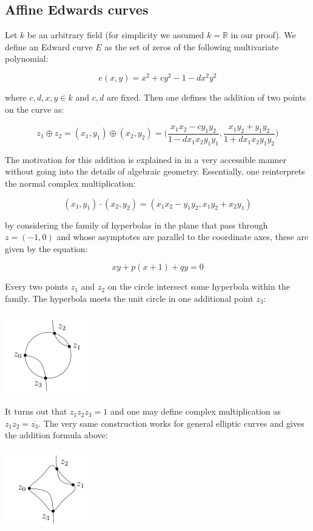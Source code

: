\subsection{Affine Edwards curves}

Let $k$ be an arbitrary field (for simplicity we assumed $k = \mathbb{R}$ in our proof). We define an Edward curve $E$ as the set of zeros of the following multivariate polynomial:

$$e(x,y) = x^2 + cy^2 - 1 - d x^2y^2$$

where $c,d,x,y \in k$ and $c,d$ are fixed. Then one defines the addition of two points on the curve as:

$$z_1 \oplus z_2 = (x_1,y_1) \oplus (x_2,y_2) = \Big(\frac{x_1x_2-cy_1y_2}{1-dx_1x_2y_1y_1},\frac{x_1y_2+y_1 y_2}{1+d x_1 x_2 y_1y_2}\Big)$$

The motivation for this addition is explained in \cite{hales2016group} in a very accessible manner without going into the details of algebraic geometry. Essentially, one reinterprets the normal complex multiplication:

$$(x_1,y_1) \cdot (x_2,y_2) = (x_1 x_2 - y_1 y_2, x_1 y_2 + x_2 y_1)$$

by considering the family of hyperbolas in the plane that pass through $z = (-1,0)$ and whose asymptotes are parallel to the coordinate axes, these are given by the equation:

$$xy + p(x + 1) + qy = 0$$

Every two points $z_1$ and $z_2$ on the circle intersect some hyperbola within the family. The hyperbola meets the unit circle in one additional point $z_3$:

\begin{center}
\includegraphics{img/hyp_circ.png}
\end{center}

It turns out that $z_1 z_2 z_3 = 1$ and one may define complex multiplication as $z_1 z_2 = \overline{z_3}$. The very same construction works for general elliptic curves and gives the addition formula above:

\begin{center}
	\includegraphics{img/hyp_ellip.png}
\end{center}

